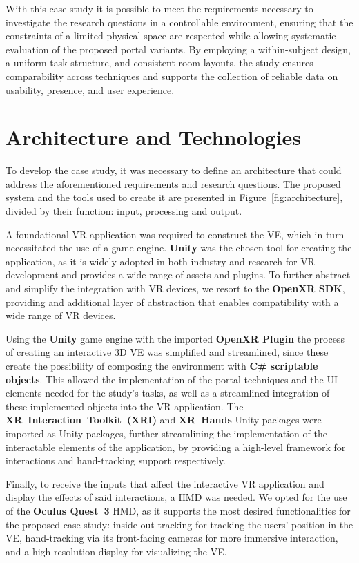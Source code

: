 With this case study it is possible to meet the requirements necessary to investigate the research questions in a controllable environment, 
ensuring that the constraints of a limited physical space are respected while allowing systematic evaluation of the proposed portal variants. 
By employing a within-subject design, a uniform task structure, and consistent room layouts, the study ensures comparability across techniques 
and supports the collection of reliable data on usability, presence, and user experience.

\section{Architecture and Technologies}
\label{sec:architecture-and-technologies}

To develop the case study, it was necessary to define an architecture that could address the aforementioned requirements and research questions.
The proposed system and the tools used to create it are presented in Figure~\ref{fig:architecture}, divided by their function: input, processing 
and output.

A foundational \gls{VR} application was required to construct the \gls{VE}, which in turn necessitated the use of a game engine. \textbf{Unity} 
was the chosen tool for creating the application, as it is widely adopted in both industry and research for \gls{VR} development and provides 
a wide range of assets and plugins. To further abstract and simplify the integration with \gls{VR} devices, we resort to the \textbf{OpenXR SDK}, 
providing and additional layer of abstraction that enables compatibility with a wide range of \gls{VR} devices.

Using the \textbf{Unity} game engine with the imported \textbf{OpenXR Plugin} the process of creating an interactive 3D \gls{VE} was simplified and streamlined, 
since these create the possibility of composing the environment with \textbf{C\# scriptable objects}. This allowed the implementation of the portal 
techniques and the UI elements needed for the study's tasks, as well as a streamlined integration of these implemented objects into the \gls{VR} 
application. The \textbf{XR~Interaction~Toolkit~(XRI)} and \textbf{XR~Hands} Unity packages were imported as Unity packages, further streamlining 
the implementation of the interactable elements of the application, by providing a high-level framework for interactions and 
hand-tracking support respectively.

Finally, to receive the inputs that affect the interactive \gls{VR} application and display the effects of said interactions, a \gls{HMD} was 
needed. We opted for the use of the \textbf{Oculus Quest~3} \gls{HMD}, as it supports the most desired functionalities for the proposed 
case study: inside-out tracking for tracking the users' position in the \gls{VE}, hand-tracking via its front-facing cameras for more 
immersive interaction, and a high-resolution display for visualizing the \gls{VE}.

